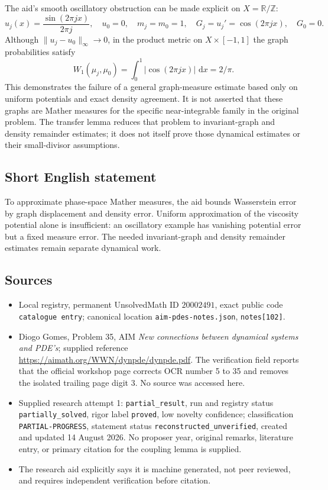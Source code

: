 \documentclass[11pt]{article}
\newcommand{\Z}{\mathbb{Z}}
\newcommand{\R}{\mathbb{R}}
\newcommand{\dd}{\,\mathrm{d}}
\begin{document}
The aid's smooth oscillatory obstruction can be made explicit on \(X=\R/\Z\):
\[
 u_j(x)=\frac{\sin(2\pi jx)}{2\pi j},\quad
 u_0=0,\quad m_j=m_0=1,\quad
 G_j=u_j'=\cos(2\pi jx),\quad G_0=0.
\]
Although \(\|u_j-u_0\|_\infty\to0\), in the product metric on \(X\times[-1,1]\) the graph probabilities satisfy
\[
 W_1(\mu_j,\mu_0)=\int_0^1|\cos(2\pi jx)|\,\dd x=2/\pi.
\]
This demonstrates the failure of a general graph-measure estimate based only on uniform potentials and exact density agreement. It is not asserted that these graphs are Mather measures for the specific near-integrable family in the original problem. The transfer lemma reduces that problem to invariant-graph and density remainder estimates; it does not itself prove those dynamical estimates or their small-divisor assumptions.
\subsection{Short English statement}
To approximate phase-space Mather measures, the aid bounds Wasserstein error by graph displacement and density error. Uniform approximation of the viscosity potential alone is insufficient: an oscillatory example has vanishing potential error but a fixed measure error. The needed invariant-graph and density remainder estimates remain separate dynamical work.
\subsection{Sources}
\begin{itemize}
\item Local registry, permanent UnsolvedMath ID \(20002491\), exact public code \texttt{catalogue entry}; canonical location \texttt{aim-pdes-notes.json}, \texttt{notes[102]}.
\item Diogo Gomes, Problem 35, AIM \emph{New connections between dynamical systems and PDE's}; supplied reference \url{https://aimath.org/WWN/dynpde/dynpde.pdf}. The verification field reports that the official workshop page corrects OCR number 5 to 35 and removes the isolated trailing page digit 3. No source was accessed here.
\item Supplied research attempt 1: \texttt{partial\_result}, run and registry status \texttt{partially\_solved}, rigor label \texttt{proved}, low novelty confidence; classification \texttt{PARTIAL-PROGRESS}, statement status \texttt{reconstructed\_unverified}, created and updated 14 August 2026. No proposer year, original remarks, literature entry, or primary citation for the coupling lemma is supplied.
\item The research aid explicitly says it is machine generated, not peer reviewed, and requires independent verification before citation.
\end{itemize}
\end{document}
